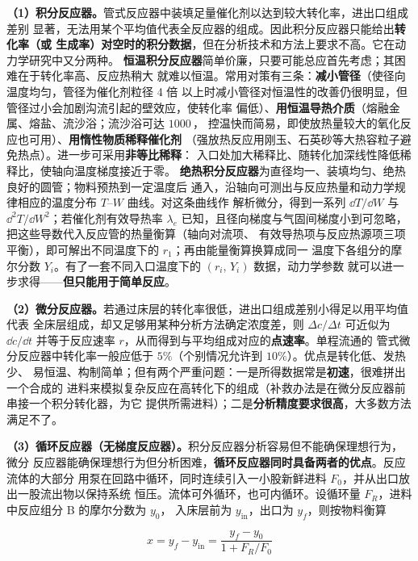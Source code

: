 \textbf{（1）积分反应器。}管式反应器中装填足量催化剂以达到较大转化率，进出口组成差别
显著，无法用某个平均值代表全反应器的组成。因此积分反应器只能给出\textbf{转化率（或
生成率）对空时的积分数据}，但在分析技术和方法上要求不高。它在动力学研究中又分两种。
\textbf{恒温积分反应器}简单价廉，只要可能总应首先考虑；其困难在于转化率高、反应热稍大
就难以恒温。常用对策有三条：\textbf{减小管径}（使径向温度均匀，管径为催化剂粒径 4 倍
以上时减小管径对恒温性的改善仍很明显，但管径过小会加剧沟流引起的壁效应，使转化率
偏低）、\textbf{用恒温导热介质}（熔融金属、熔盐、流沙浴；流沙浴可达 $1000$\,\degC，
控温快而简易，即使放热量较大的氧化反应也可用）、\textbf{用惰性物质稀释催化剂}
（强放热反应用刚玉、石英砂等大热容粒子避免热点）。进一步可采用\textbf{非等比稀释}：
入口处加大稀释比、随转化加深线性降低稀释比，使轴向温度梯度接近于零。
\textbf{绝热积分反应器}为直径均一、装填均匀、绝热良好的圆管；物料预热到一定温度后
通入，沿轴向可测出与反应热量和动力学规律相应的温度分布 $T$–$W$ 曲线。对这条曲线作
解析微分，得到一系列 $\dd T/\dd W$ 与 $\dd^{2}T/\dd W^{2}$；若催化剂有效导热率 $\lambda_e$
已知，且径向梯度与气固间梯度小到可忽略，把这些导数代入反应管的热量衡算（轴向对流项、
有效导热项与反应热源项三项平衡），即可解出不同温度下的 $r_1$；再由能量衡算换算成同一
温度下各组分的摩尔分数 $Y_i$。有了一套不同入口温度下的 $(r_i,\,Y_i)$ 数据，动力学参数
就可以进一步求得——\textbf{但只能用于简单反应}。

\textbf{（2）微分反应器。}若通过床层的转化率很低，进出口组成差别小得足以用平均值代表
全床层组成，却又足够用某种分析方法确定浓度差，则 $\Delta c/\Delta t$ 可近似为
$\dd c/\dd t$ 并等于反应速率 $r$，从而得到与平均组成对应的\textbf{点速率}。单程流通的
管式微分反应器中转化率一般应低于 $5\%$（个别情况允许到 $10\%$）。优点是转化低、发热少、
易恒温、构制简单；但有两个严重问题：一是所得数据常是\textbf{初速}，很难拼出一个合成的
进料来模拟复杂反应在高转化下的组成（补救办法是在微分反应器前串接一个积分转化器，为它
提供所需进料）；二是\textbf{分析精度要求很高}，大多数方法满足不了。

\textbf{（3）循环反应器（无梯度反应器）。}积分反应器分析容易但不能确保理想行为，微分
反应器能确保理想行为但分析困难，\textbf{循环反应器同时具备两者的优点}。反应流体的大部分
用泵在回路中循环，同时连续引入一小股新鲜进料 $F_0$，并从出口放出一股流出物以保持系统
恒压。流体可外循环，也可内循环。设循环量 $F_R$，进料中反应组分 B 的摩尔分数为 $y_0$，
入床层前为 $y_{\mathrm{in}}$，出口为 $y_f$，则按物料衡算

\begin{equation}
x=y_f-y_{\mathrm{in}}=\frac{y_f-y_0}{1+F_R/F_0}
\label{eq:recycle-x}
\end{equation}

